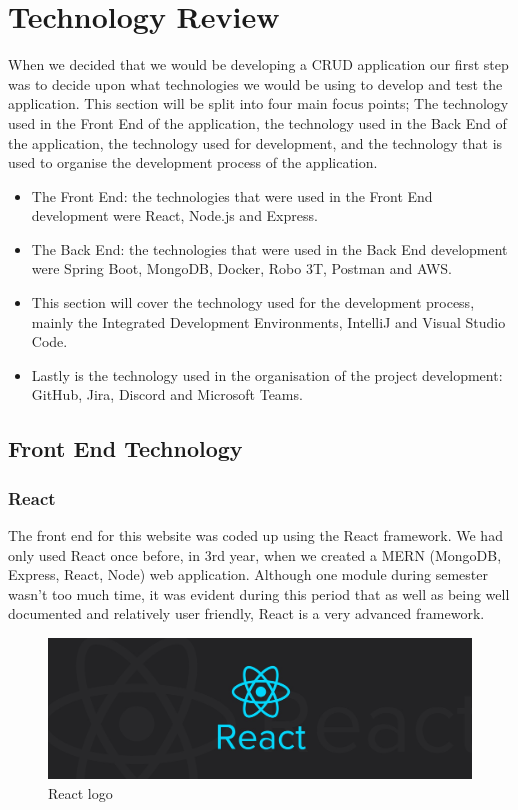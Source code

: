 \chapter{Technology Review}
 When we decided that we would be developing a CRUD application our first step was to decide upon what technologies we would be using to develop and test the application. This section will be split into four main focus points; The technology used in the Front End of the application, the technology used in the Back End of the application, the technology used for development, and the technology that is used to organise the development process of the application.
\begin{itemize}
\item The Front End: the technologies that were used in the Front End development were React, Node.js and Express.
\item The Back End: the technologies that were used in the Back End development were Spring Boot, MongoDB, Docker, Robo 3T, Postman and AWS.
\item This section will cover the technology used for the development process, mainly the Integrated Development Environments, IntelliJ and Visual Studio Code.
\item Lastly is the technology used in the organisation of the project development: GitHub, Jira, Discord and Microsoft Teams.
\end{itemize}

\section{Front End Technology}
\subsection{React}
The front end for this website was coded up using the React framework. We had only used React once before, in 3rd year, when we created a MERN (MongoDB, Express, React, Node) web application. Although one module during semester wasn't too much time, it was evident during this period that as well as being well documented and relatively user friendly, React is a very advanced framework.

\begin{figure}[th]
\renewcommand\thefigure{3.1}
\centering
\includegraphics[scale = .2]{img/reactImage.jpeg}
\caption{React logo}
\label{React}
\end{figure}

